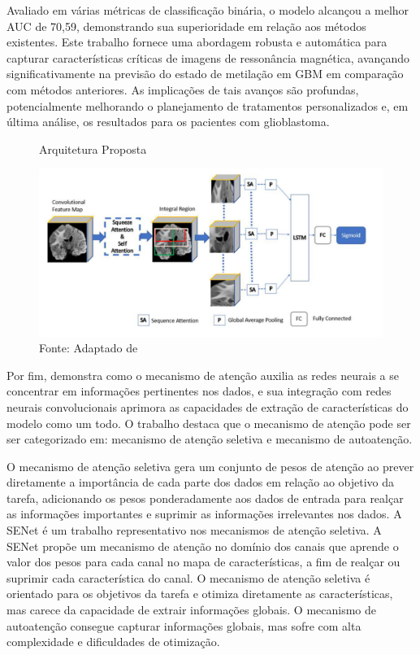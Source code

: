 Avaliado em várias métricas de classificação binária, o modelo alcançou a melhor \gls{AUC} de 70,59, demonstrando sua superioridade em relação aos métodos existentes. Este trabalho fornece uma abordagem robusta e automática para capturar características críticas de imagens de ressonância magnética, avançando significativamente na previsão do estado de metilação em \gls{GBM} em comparação com métodos anteriores. As implicações de tais avanços são profundas, potencialmente melhorando o planejamento de tratamentos personalizados e, em última análise, os resultados para os pacientes com glioblastoma.

\begin{figure}[htbp]
    \centering
    \caption{Arquitetura Proposta}
    \includegraphics[width=1\textwidth]{figures/fig010.png}
    \caption*{Fonte: Adaptado de \cite{iranmehrImprovedPredictionMGMT2022}}
    \label{fig:fig010}
\end{figure}


Por fim,  demonstra como o mecanismo de atenção auxilia as redes neurais a se concentrar em informações pertinentes nos dados, e sua integração com redes neurais convolucionais aprimora as capacidades de extração de características do modelo como um todo. O trabalho destaca que o mecanismo de atenção pode ser ser categorizado em: mecanismo de atenção seletiva e mecanismo de autoatenção.

O mecanismo de atenção seletiva gera um conjunto de pesos de atenção ao prever diretamente a importância de cada parte dos dados em relação ao objetivo da tarefa, adicionando os pesos ponderadamente aos dados de entrada para realçar as informações importantes e suprimir as informações irrelevantes nos dados. A \gls{SE}Net é um trabalho representativo nos mecanismos de atenção seletiva. A \gls{SE}Net propõe um mecanismo de atenção no domínio dos canais que aprende o valor dos pesos para cada canal no mapa de características, a fim de realçar ou suprimir cada característica do canal. O mecanismo de atenção seletiva é orientado para os objetivos da tarefa e otimiza diretamente as características, mas carece da capacidade de extrair informações globais. O mecanismo de autoatenção consegue capturar informações globais, mas sofre com alta complexidade e dificuldades de otimização. 

